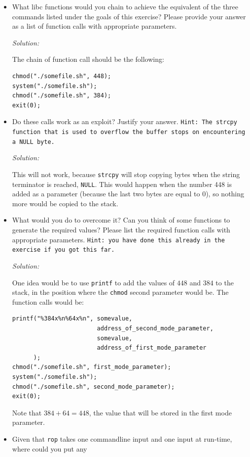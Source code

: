 \documentclass[a4paper,11pt]{article}
\newenvironment{solution}%
{\par{\noindent\small\textit{Solution:}}\vspace{-12pt}\begin{framed}}%
{\end{framed}\par}
\begin{document}
\begin{itemize}
\item What libc functions would you chain to achieve the equivalent of the three
  commands listed under the goals of this exercise? Please provide your answer as
  a list of function calls with appropriate parameters.
\ifsolution\begin{solution}
The chain of function call should be the following:
\begin{lstlisting}
chmod("./somefile.sh", 448);
system("./somefile.sh");
chmod("./somefile.sh", 384);
exit(0);
\end{lstlisting}
\end{solution}\fi
\item Do these calls work as an exploit? Justify your
  answer. \texttt{Hint: The \texttt{strcpy} function that is used to overflow
    the buffer stops on encountering a \texttt{NULL} byte.}
\ifsolution\begin{solution}
This will not work, because \texttt{strcpy} will stop copying bytes when the string
terminator is reached, \texttt{NULL}. This would happen when the number 448 is added as a
parameter (because the last two bytes are equal to $0$), so nothing more would be copied to the
stack.
\end{solution}\fi
\item What would you do to overcome it? Can you think of some functions to
generate the required values? Please list the
  required function calls with appropriate parameters. \texttt{Hint:
    you have done this already in the exercise if you got this far.}
\ifsolution\begin{solution}
One idea would be to use \texttt{printf} to add the values of $448$ and $384$ to the stack,
in the position where the \texttt{chmod} second parameter would be. The function calls would be:
\begin{lstlisting}
printf("%384x%n%64x%n", somevalue,
                        address_of_second_mode_parameter,
                        somevalue,
                        address_of_first_mode_parameter
      );
chmod("./somefile.sh", first_mode_parameter);
system("./somefile.sh");
chmod("./somefile.sh", second_mode_parameter);
exit(0);
\end{lstlisting}
Note that $384 + 64 = 448$, the value that will be stored in the first mode parameter.
\end{solution}\fi
\item Given that \texttt{rop} takes one commandline input and one input at run-time, where could you put any

\end{itemize}
\end{document}
